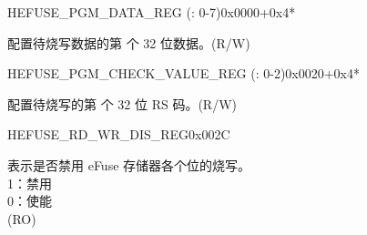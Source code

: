 \begin{register}{H}{EFUSE\_PGM\_DATA\_REG (: 0-7)}{0x0000+0x4*}\label{regdesc:EFUSEPGMDATANREG}
%
\regnewline%
\begin{regdesc}\begin{reglist}
\label{fielddesc:EFUSEPGMDATAN}\item [EFUSE\_PGM\_DATA\_\regindex{n}] 配置待烧写数据的第  个 32 位数据。(R/W)
\end{reglist}\end{regdesc}
\end{register}


\begin{register}{H}{EFUSE\_PGM\_CHECK\_VALUE\_REG (: 0-2)}{0x0020+0x4*}\label{regdesc:EFUSEPGMCHECKVALUEMREG}
%
\regnewline%
\begin{regdesc}\begin{reglist}
\label{fielddesc:EFUSEPGMRSDATAM}\item [EFUSE\_PGM\_RS\_DATA\_\regindex{m}] 配置待烧写的第  个 32 位 RS 码。(R/W)
\end{reglist}\end{regdesc}
\end{register}


\begin{register}{H}{EFUSE\_RD\_WR\_DIS\_REG}{0x002C}\label{regdesc:EFUSERDWRDISREG}
%
\regnewline%
\begin{regdesc}\begin{reglist}
\label{fielddesc:EFUSEWRDIS}\item [EFUSE\_WR\_DIS] 表示是否禁用 eFuse 存储器各个位的烧写。\\
1：禁用\\
0：使能\\
(RO)
\end{reglist}\end{regdesc}
\end{register}


